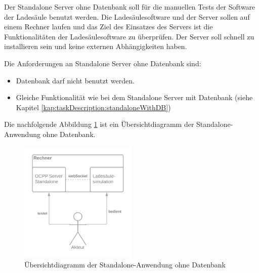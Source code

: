Der Standalone Server ohne Datenbank soll für die manuellen Tests der Software der Ladesäule benutzt werden. 
Die Ladesäulesoftware und der Server sollen auf einem Rechner laufen und das Ziel des Einsatzes des Servers ist 
die Funktionalitäten der Ladesäulesoftware zu überprüfen. Der Server soll schnell zu installieren sein und keine externen 
Abhängigkeiten haben.

Die Anforderungen an Standalone Server ohne Datenbank sind:
\begin{itemize}
    \item Datenbank darf nicht benutzt werden.
    \item Gleiche Funktionalität wie bei dem Standalone Server mit Datenbank (siehe Kapitel \ref{kap:taskDescription:standaloneWithDB})
\end{itemize}

Die nachfolgende Abbildung \ref{fig:summaryDiagrammStandaloneWithoutDB} ist ein Übersichtdiagramm der Standalone-Anwendung ohne Datenbank.
\begin{figure}[H]
    \centering
    \includegraphics[width=0.5\textwidth]{./images/OCPP Server Standalone ohne DB.png}
    \caption[Übersichtdiagramm der Standalone-Anwendung ohne Datenbank]{Übersichtdiagramm der Standalone-Anwendung ohne Datenbank}
    \label{fig:summaryDiagrammStandaloneWithoutDB}
\end{figure}